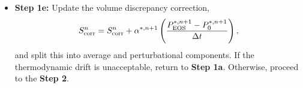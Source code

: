 \documentclass[final]{siamltex}
\def\wb {{\bf w}}
\begin{document}
\begin{itemize}
{\bf Step 1d-3:} Update the temperature and enthalpy using
\begin{equation}
T^{*,n+1,l+1} = T^{*,n+1,l} + \delta T, \quad h^{*,n+1,l+1} = h(\wb^{*,n+1},T^{*,n+1,l+1}).
\end{equation}
If $l=l_{\rm max}$, set $(h,T)^{*,n+1} = (h,T)^{*,n+1,l+1}$ and proceed to {\bf Step 1e}.\\
\item {\bf Step 1e:} Update the volume discrepancy correction,
\begin{equation}
S_{\rm corr}^n = S_{\rm corr}^n + \alpha^{*,n+1}\left(\frac{P_{\rm EOS}^{*,n+1} - P_0^{*,n+1}}{\Delta t}\right),
\end{equation}
and split this into average and perturbational components.
If the thermodynamic drift is unacceptable, return to {\bf Step 1a}.
Otherwise, proceed to the {\bf Step 2}.\\
\end{itemize}
\end{document}
